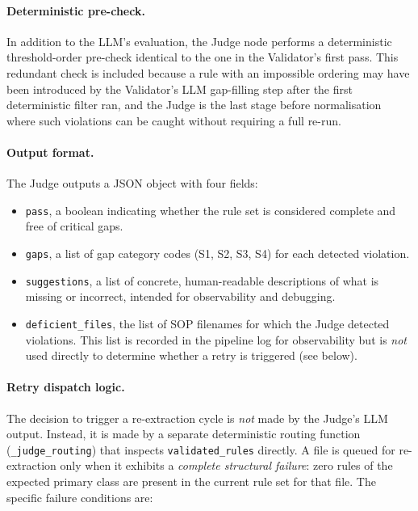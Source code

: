 ﻿\documentclass[11pt]{article}
\begin{document}
\paragraph{Deterministic pre-check.}
In addition to the LLM's evaluation, the Judge node performs a deterministic
threshold-order pre-check identical to the one in the Validator's first pass.
This redundant check is included because a rule with an impossible ordering may
have been introduced by the Validator's LLM gap-filling step after the first
deterministic filter ran, and the Judge is the last stage before normalisation
where such violations can be caught without requiring a full re-run.

\paragraph{Output format.}
The Judge outputs a JSON object with four fields:
\begin{itemize}
    \item \texttt{pass}, a boolean indicating whether the rule set is
          considered complete and free of critical gaps.
    \item \texttt{gaps}, a list of gap category codes (S1, S2, S3, S4)
          for each detected violation.
    \item \texttt{suggestions}, a list of concrete, human-readable descriptions
          of what is missing or incorrect, intended for observability and debugging.
    \item \texttt{deficient\_files}, the list of SOP filenames for which the
          Judge detected violations.  This list is recorded in the pipeline log
          for observability but is \emph{not} used directly to determine whether
          a retry is triggered (see below).
\end{itemize}

\paragraph{Retry dispatch logic.}
The decision to trigger a re-extraction cycle is \emph{not} made by the Judge's
LLM output.  Instead, it is made by a separate deterministic routing function
(\texttt{\_judge\_routing}) that inspects \texttt{validated\_rules} directly.
A file is queued for re-extraction only when it exhibits a \emph{complete
structural failure}: zero rules of the expected primary class are present in the
current rule set for that file.  The specific failure conditions are:
\end{document}
